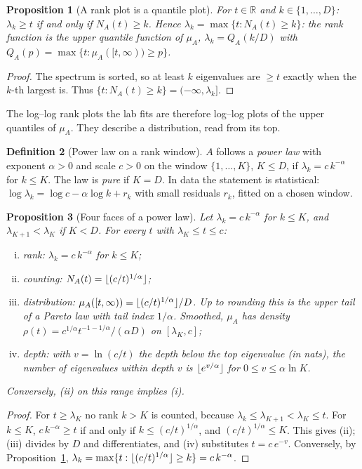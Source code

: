 \documentclass[11pt,a4paper]{article}
\newcommand{\R}{\mathbb{R}}
\DeclarePairedDelimiter{\floor}{\lfloor}{\rfloor}
\theoremstyle{plain}
\newtheorem{proposition}{Proposition}[section]
\theoremstyle{definition}
\newtheorem{definition}[proposition]{Definition}
\theoremstyle{remark}
\begin{document}
\begin{proposition}[A rank plot is a quantile plot]\label{prop:quantile}
For $t\in\R$ and $k\in\{1,\dots,D\}$: $\lambda_k\ge t$ if and only if $N_A(t)\ge k$. Hence
$\lambda_k=\max\{t:N_A(t)\ge k\}$: the rank function is the upper quantile function of $\mu_A$,
$\lambda_k=Q_A(k/D)$ with $Q_A(p)=\max\{t:\mu_A([t,\infty))\ge p\}$.
\end{proposition}
\begin{proof}
The spectrum is sorted, so at least $k$ eigenvalues are $\ge t$ exactly when the $k$-th largest is. Thus
$\{t:N_A(t)\ge k\}=(-\infty,\lambda_k]$.
\end{proof}
The log--log rank plots the lab fits are therefore log--log plots of the upper quantiles of $\mu_A$. They describe a
distribution, read from its top.

\begin{definition}[Power law on a rank window]
$A$ follows a \emph{power law} with exponent $\alpha>0$ and scale $c>0$ on the window $\{1,\dots,K\}$, $K\le D$, if
$\lambda_k=c\,k^{-\alpha}$ for $k\le K$. The law is \emph{pure} if $K=D$. In data the statement is statistical:
$\log\lambda_k=\log c-\alpha\log k+r_k$ with small residuals $r_k$, fitted on a chosen window.
\end{definition}

\begin{proposition}[Four faces of a power law]\label{prop:faces}
Let $\lambda_k=c\,k^{-\alpha}$ for $k\le K$, and $\lambda_{K+1}<\lambda_K$ if $K<D$. For every $t$ with
$\lambda_K\le t\le c$:
\begin{enumerate}[(i)]
\item \emph{rank:} $\lambda_k=c\,k^{-\alpha}$ for $k\le K$;
\item \emph{counting:} $N_A(t)=\floor{(c/t)^{1/\alpha}}$;
\item \emph{distribution:} $\mu_A([t,\infty))=\floor{(c/t)^{1/\alpha}}/D$. Up to rounding this is the upper tail of a
  Pareto law with tail index $1/\alpha$. Smoothed, $\mu_A$ has density
  $\rho(t)=c^{1/\alpha}t^{-1-1/\alpha}/(\alpha D)$ on $[\lambda_K,c]$;
\item \emph{depth:} with $v=\ln(c/t)$ the depth below the top eigenvalue (in nats), the number of eigenvalues
  within depth $v$ is $\floor{e^{v/\alpha}}$ for $0\le v\le\alpha\ln K$.
\end{enumerate}
Conversely, (ii) on this range implies (i).
\end{proposition}
\begin{proof}
For $t\ge\lambda_K$ no rank $k>K$ is counted, because $\lambda_k\le\lambda_{K+1}<\lambda_K\le t$. For $k\le K$,
$c\,k^{-\alpha}\ge t$ if and only if $k\le(c/t)^{1/\alpha}$, and $(c/t)^{1/\alpha}\le K$. This gives (ii); (iii)
divides by $D$ and differentiates, and (iv) substitutes $t=c\,e^{-v}$. Conversely, by
Proposition~\ref{prop:quantile}, $\lambda_k=\max\{t:\floor{(c/t)^{1/\alpha}}\ge k\}=c\,k^{-\alpha}$.
\end{proof}
\end{document}
